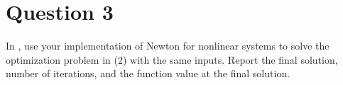 \section{Question 3}

\begin{question}
    In \MATLAB, use your implementation of Newton for nonlinear systems to solve the optimization problem in (2) with the same inputs. Report the final solution, number of iterations, and the function value at the final solution.
\end{question}

\begin{answer}
    
\end{answer}